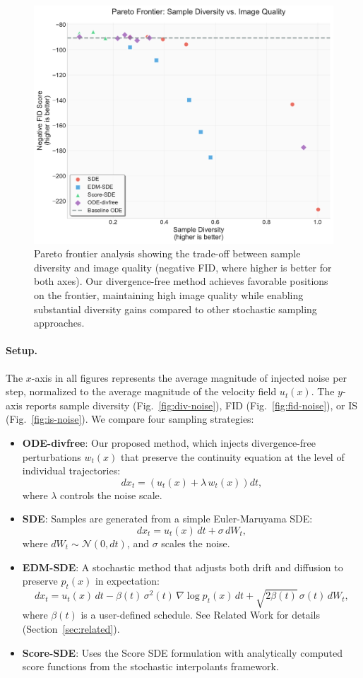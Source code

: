 \documentclass{article}
\begin{document}
\begin{figure}[H]
  \centering
  \includegraphics[width=0.7\linewidth]{figures/pareto_diversity_vs_fid.pdf}
  \caption{Pareto frontier analysis showing the trade-off between sample diversity and image quality (negative FID, where higher is better for both axes). Our divergence-free method achieves favorable positions on the frontier, maintaining high image quality while enabling substantial diversity gains compared to other stochastic sampling approaches.}
  \label{fig:pareto-fid}
\end{figure}

\paragraph{Setup.}
The $x$-axis in all figures represents the average magnitude of injected noise per step, normalized to the average magnitude of the velocity field \( u_t(x) \). The $y$-axis reports sample diversity (Fig.~\ref{fig:div-noise}), FID (Fig.~\ref{fig:fid-noise}), or IS (Fig.~\ref{fig:is-noise}). We compare four sampling strategies:

\begin{itemize}
  \item \textbf{ODE-divfree}: Our proposed method, which injects divergence-free perturbations \( w_t(x) \) that preserve the continuity equation at the level of individual trajectories:
  \[
  dx_t = \left(u_t(x) + \lambda\,w_t(x)\right) dt,
  \]
  where \( \lambda \) controls the noise scale.
  \item \textbf{SDE}: Samples are generated from a simple Euler-Maruyama SDE:
  \[
  dx_t = u_t(x)\,dt + \sigma\,dW_t,
  \]
  where \( dW_t \sim \mathcal{N}(0, dt) \), and \(\sigma\) scales the noise.
  \item \textbf{EDM-SDE}: A stochastic method that adjusts both drift and diffusion to preserve \(p_t(x)\) in expectation:
  \[
  dx_t = u_t(x)\,dt - \beta(t)\,\sigma^2(t)\,\nabla \log p_t(x)\,dt + \sqrt{2\beta(t)}\,\sigma(t)\,dW_t,
  \]
  where \(\beta(t)\) is a user-defined schedule. See Related Work for details (Section~\ref{sec:related}).
  \item \textbf{Score-SDE}: Uses the Score SDE formulation with analytically computed score functions from the stochastic interpolants framework.
\end{itemize}
\end{document}
